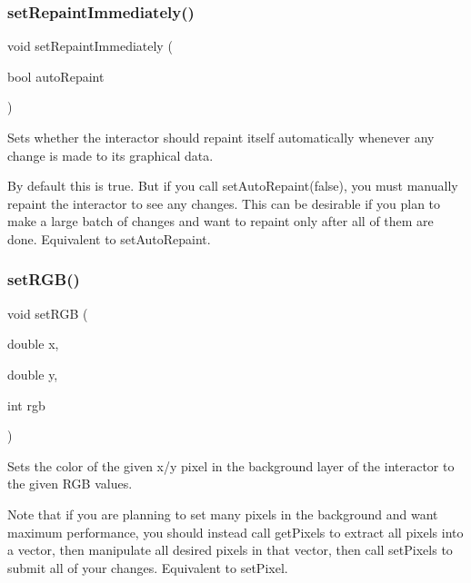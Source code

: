 \subsubsection{\texorpdfstring{set\+Repaint\+Immediately()}{setRepaintImmediately()}}
{\footnotesize\ttfamily void set\+Repaint\+Immediately (\begin{DoxyParamCaption}\item[{bool}]{auto\+Repaint }\end{DoxyParamCaption})\hspace{0.3cm}{\ttfamily [virtual]}}



Sets whether the interactor should repaint itself automatically whenever any change is made to its graphical data. 

By default this is true. But if you call set\+Auto\+Repaint(false), you must manually repaint the interactor to see any changes. This can be desirable if you plan to make a large batch of changes and want to repaint only after all of them are done. Equivalent to set\+Auto\+Repaint. \mbox{\label{classsgl_1_1GDrawingSurface_a8bcbd65fa784bdab1e66a9efd381162d}} 
\subsubsection{\texorpdfstring{set\+R\+G\+B()}{setRGB()}\hspace{0.1cm}{\footnotesize\ttfamily [1/3]}}
{\footnotesize\ttfamily void set\+R\+GB (\begin{DoxyParamCaption}\item[{double}]{x,  }\item[{double}]{y,  }\item[{int}]{rgb }\end{DoxyParamCaption})\hspace{0.3cm}{\ttfamily [virtual]}}



Sets the color of the given x/y pixel in the background layer of the interactor to the given R\+GB values. 

Note that if you are planning to set many pixels in the background and want maximum performance, you should instead call get\+Pixels to extract all pixels into a vector, then manipulate all desired pixels in that vector, then call set\+Pixels to submit all of your changes. Equivalent to set\+Pixel.


